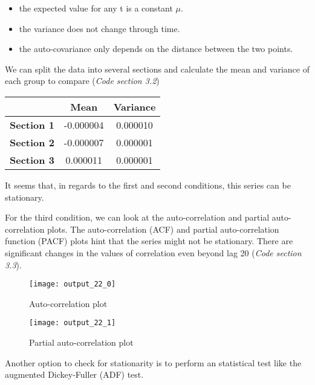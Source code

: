 \documentclass[11pt]{article}
\begin{document}
\begin{itemize}
	\item the expected value for any t is a constant $\mu$.
	\item the variance does not change through time.
	\item the auto-covariance only depends on the distance between the two points. 	
\end{itemize}

We can split the data into several sections and calculate the mean and variance of each group to compare (\textsl{Code section 3.2})\\
\medskip
{
\begin{center}
	\centering
\begin{tabular}{|c|c|c|}
	\hline 
	&\textbf{Mean}&\textbf{Variance}  \\ 
	\hline 
	\textbf{Section 1}&-0.000004&0.000010\\ 
	\hline 
	\textbf{Section 2}&-0.000007&0.000001\\ 
	\hline 
	\textbf{Section 3}&0.000011&0.000001\\ 
	\hline 
\end{tabular} 
\end{center}

It seems that, in regards to the first and second conditions, this series can be stationary.\\
\medskip

For the third condition, we can look at the auto-correlation and partial auto-correlation plots. The auto-correlation (ACF) and partial auto-correlation function (PACF) plots hint that the series might not be stationary. There are significant changes in the values of correlation even beyond lag 20 (\textsl{Code section 3.3}).

\begin{figure}[H]
	\centering
	\texttt{[image: output\_22\_0]}
	\caption{Auto-correlation plot}
	\label{fig:acf}
\end{figure}

\begin{figure}[H]
	\centering
	\texttt{[image: output\_22\_1]}
	\caption{Partial auto-correlation plot}
	\label{fig:pacf}
\end{figure}

Another option to check for stationarity is to perform an statistical test like the augmented Dickey-Fuller (ADF) test.\\

}
\end{document}
